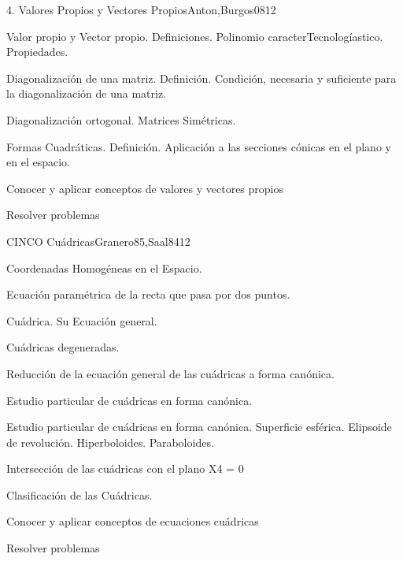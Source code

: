 \begin{syllabus}
\begin{unit}{4. Valores Propios y Vectores Propios}{Anton,Burgos08}{12}
\begin{topics}
      \item Valor propio y Vector propio. Definiciones. Polinomio caracterTecnologíastico. Propiedades.
      \item Diagonalización de una matriz. Definición. Condición, necesaria y suficiente para la diagonalización de una matriz.
      \item Diagonalización ortogonal. Matrices Simétricas.
	\item Formas Cuadráticas. Definición. Aplicación a las secciones cónicas en el plano y en el espacio.
	\end{topics}

   \begin{unitgoals}
      \item Conocer y aplicar conceptos de valores y vectores propios
	\item Resolver problemas
   \end{unitgoals}
\end{unit}

\begin{unit}{CINCO Cuádricas}{Granero85,Saal84}{12}
\begin{topics}
      \item Coordenadas Homogéneas en el Espacio.
	\item Ecuación paramétrica de la recta que pasa por dos puntos.
	\item Cuádrica. Su Ecuación general.
	\item Cuádricas degeneradas.
	\item Reducción de la ecuación general de las cuádricas a forma canónica.
	\item Estudio particular de cuádricas en forma canónica.
	\item Estudio particular de cuádricas en forma canónica. Superficie esférica. Elipsoide de revolución. Hiperboloides. Paraboloides.
	\item Intersección de las cuádricas con el plano X4 = 0
	\item Clasificación de las Cuádricas.
   \end{topics}

   \begin{unitgoals}
      \item Conocer y aplicar conceptos de ecuaciones cuádricas
	\item Resolver problemas
   \end{unitgoals}
\end{unit}

\begin{coursebibliography}
\end{coursebibliography}
\end{syllabus}
